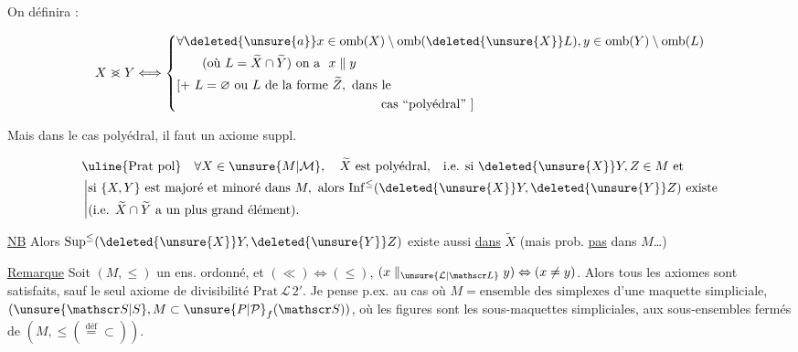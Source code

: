 
On définira :

\[
X\mathrel{>\mkern-13mu<}Y\Longleftrightarrow
\left\{\begin{aligned}
&\forall\deleted{\unsure{a}}x\in\mathrm{omb}(X)\setminus\mathrm{omb}(\deleted{\unsure{X}}L),y\in\mathrm{omb}(Y)\setminus\mathrm{omb}(L)\\
&\qquad(\text{où }L=\widetilde X\cap\widetilde Y)\ \text{on a }\ x\parallel y\\
&[+\ L=\varnothing\ \text{ou } L\ \text{de la forme }\widetilde Z,\ \text{dans le}\\
&\hspace{16em}\text{cas ``polyédral''}\ ]
\end{aligned}\right.
\]


Mais dans le cas polyédral, il faut un axiome suppl.

\[
\begin{aligned}
&\text{\uline{Prat pol}}\quad \forall X\in\unsure{M|\mathcal M},\quad \widetilde X\ \text{est polyédral,}\quad \text{i.e. si } \deleted{\unsure{X}}Y,Z\in M\ \text{et}\\
&\left\lvert\begin{aligned}
&\text{si }\{X,Y\}\ \text{est majoré et minoré dans }M,\ \text{alors }\mathrm{Inf}^{\leq}(\deleted{\unsure{X}}Y,\deleted{\unsure{Y}}Z)\ \text{existe}\\
&(\text{i.e. }\widetilde X\cap\widetilde Y\ \text{a un plus grand élément}).
\end{aligned}\right.
\end{aligned}
\]

\uline{NB} Alors $\mathrm{Sup}^{\leq}(\deleted{\unsure{X}}Y,\deleted{\unsure{Y}}Z)$ existe aussi \uline{dans} $\widetilde X$ (mais prob.  \uline{pas} dans $M$\ldots)

\uline{Remarque} Soit $(M,\leq)$ un ens. ordonné, et  $(\ll)\Leftrightarrow(\leq)$, $(x\parallel_{\unsure{\mathcal L|\mathscr L}}y)\Leftrightarrow(x\ne y)$. Alors tous les axiomes sont satisfaits, sauf le seul axiome de divisibilité $\mathrm{Prat}\,\mathcal L\,2'$. Je pense p.ex. au cas où $M={}\text{ensemble des simplexes}$ d'une maquette simpliciale, $(\unsure{\mathscr S|S},M\subset\unsure{P|\mathcal P}_{f}(\mathscr S))$, où les figures sont les sous-maquettes simpliciales,  aux sous-ensembles fermés de $(M,\leq(\overset{\mathrm{déf}}{=}\subset))$.

